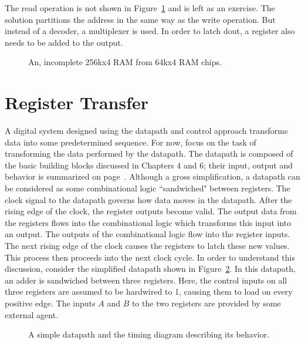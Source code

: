 The read operation is not shown in Figure~\ref{fig:sequentialBBdeep} and is left
as an exercise.  The solution partitions the address in the same way as the
write operation.  But instead of a decoder, a multiplexer is used.  In order to
latch dout, a register also needs to be added to the output.


\begin{figure}[ht]

\caption{An, incomplete 256kx4 RAM from 64kx4 RAM chips.}
\label{fig:sequentialBBdeep}

\end{figure}


\section{Register Transfer}
A digital system designed using the datapath and control approach 
transforms data into some predetermined sequence.  For now, focus 
on the task of transforming the data performed by the datapath.  
The datapath is composed of the basic building blocks discussed in 
Chapters 4 and 6; their input, output and behavior is summarized on 
page~\pageref{page:boxlist}.  Although a gross simplification, a 
datapath can be considered as some combinational logic ``sandwiched" 
between registers.  The clock signal to the datapath governs how 
data moves in the datapath. After the rising edge of the clock, the 
register outputs become valid. The output data from the registers 
flows into the combinational logic which transforms this input into 
an output.  The outputs of the combinational logic flow into the 
register inputs.  The next rising edge of the clock causes the 
registers to latch these new values.  This process then proceeds 
into the next clock cycle.  In order to understand this discussion, 
consider the simplified datapath shown in Figure~\ref{fig:sequentialBBsimple}.  
In this datapath, an adder is sandwiched between three registers.  
Here, the control inputs on all three registers are assumed to be 
hardwired to 1, causing them to load on every positive edge.  The 
inputs $A$ and $B$ to the two registers are provided by some 
external agent.
  
\begin{figure}[ht]

\caption{A simple datapath and the timing diagram describing its
behavior.}
\label{fig:sequentialBBsimple}

\end{figure}

